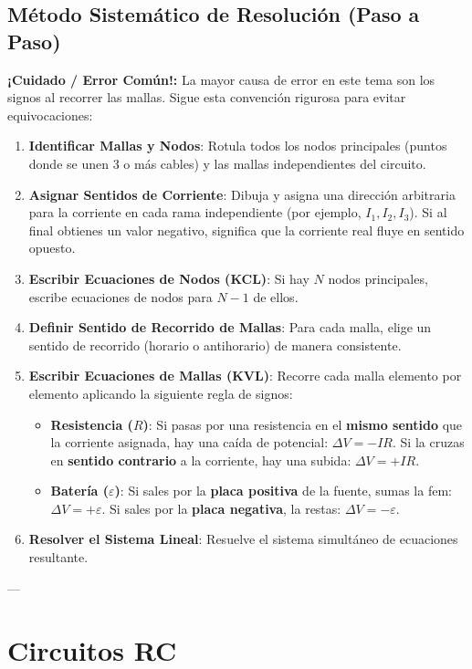 \documentclass[12pt, a4paper]{article}
\newcommand{\alerta}[1]{\begin{alertabox}\textbf{¡Cuidado / Error Común!:} #1\end{alertabox}}
\begin{document}
\subsection{Método Sistemático de Resolución (Paso a Paso)}

\alerta{La mayor causa de error en este tema son los signos al recorrer las mallas. Sigue esta convención rigurosa para evitar equivocaciones:}

\begin{enumerate}
    \item \textbf{Identificar Mallas y Nodos}: Rotula todos los nodos principales (puntos donde se unen 3 o más cables) y las mallas independientes del circuito.
    \item \textbf{Asignar Sentidos de Corriente}: Dibuja y asigna una dirección arbitraria para la corriente en cada rama independiente (por ejemplo, $I_1, I_2, I_3$). Si al final obtienes un valor negativo, significa que la corriente real fluye en sentido opuesto.
    \item \textbf{Escribir Ecuaciones de Nodos (KCL)}: Si hay $N$ nodos principales, escribe ecuaciones de nodos para $N-1$ de ellos.
    \item \textbf{Definir Sentido de Recorrido de Mallas}: Para cada malla, elige un sentido de recorrido (horario o antihorario) de manera consistente.
    \item \textbf{Escribir Ecuaciones de Mallas (KVL)}: Recorre cada malla elemento por elemento aplicando la siguiente regla de signos:
    \begin{itemize}
        \item \textbf{Resistencia ($R$)}: Si pasas por una resistencia en el \textbf{mismo sentido} que la corriente asignada, hay una caída de potencial: $\Delta V = -I R$. Si la cruzas en \textbf{sentido contrario} a la corriente, hay una subida: $\Delta V = +I R$.
        \item \textbf{Batería ($\varepsilon$)}: Si sales por la \textbf{placa positiva} de la fuente, sumas la fem: $\Delta V = +\varepsilon$. Si sales por la \textbf{placa negativa}, la restas: $\Delta V = -\varepsilon$.
    \end{itemize}
    \item \textbf{Resolver el Sistema Lineal}: Resuelve el sistema simultáneo de ecuaciones resultante.
\end{enumerate}

---

\section{Circuitos RC}
\end{document}
